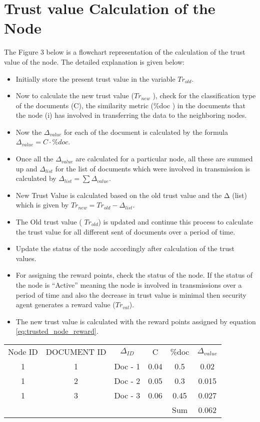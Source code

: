  \section{Trust value Calculation of the Node}
The Figure 3 below is a flowchart representation of the calculation of the trust value of the node. The detailed explanation is given below:
\begin{itemize}
    \item Initially store the present trust value in the variable \( Tr_{old} \).
    \item Now to calculate the new trust value (\( Tr_{new} \) ), check for the
    classification type of the documents (C), the similarity metric (\%doc ) in
    the documents that the node (i) has involved in transferring the data to the
    neighboring nodes.  
    \item Now the \( \Delta_{value} \) for each of the document is calculated
    by the formula  \( \Delta_{value} = C \cdot \% doc \).
    \item Once all the \( \Delta_{value} \) are calculated for a particular node, all these are
    summed up and      \( \Delta_{list} \) for the list of documents which were involved in
    transmission is calculated by \( \Delta_{list} = \sum \Delta_{value} \).  
    \item New Trust Value is calculated based on the old trust value and the Δ (list)
        which is given by \( Tr_{new} = Tr_{old} - \Delta_{list} \).
    \item The Old trust value ( \(Tr_{old} \)) is updated and continue this process to
    calculate the trust value for all different sent of documents over a period
    of time.  
    \item Update the status of the node accordingly after calculation of the
    trust values.
    \item For assigning the reward points, check the status of the node. If the status
    of the node is “Active” meaning the node is involved in transmissions over
    a period of time and also the decrease in trust value is minimal then
    security agent generates a reward value      (\( Tr_{val} \)).  
    \item The new trust value is calculated with the reward points assigned by
        equation \ref{eq:trusted_node_reward}.
\end{itemize}

\begin{tabular}{c c c c c c}
    Node ID	& DOCUMENT ID	& \( \Delta_{ID} \) 	 & C	& \%doc	& \( \Delta_{value} \) \\
1        & 1	&  Doc - 1      & 0.04       & 0.5	& 0.02 \\
1        & 2	&  Doc - 2      & 0.05       & 0.3	& 0.015 \\
1        & 3	&  Doc - 3      & 0.06       & 0.45	& 0.027 \\
         &		&	 	        &            & Sum	& 0.062
\end{tabular}

